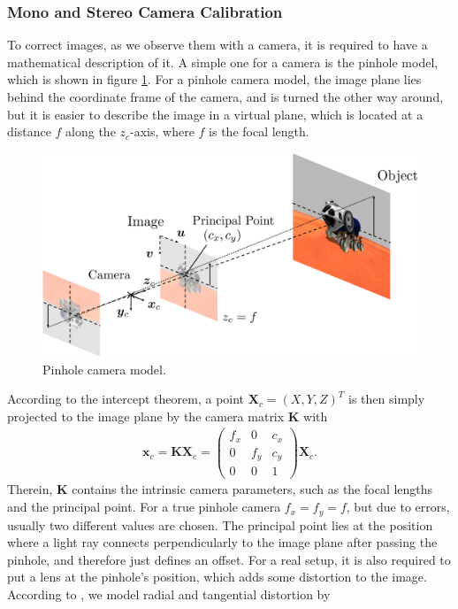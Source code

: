 \subsubsection{Mono and Stereo Camera Calibration}
To correct images, as we observe them with a camera, it is required to have a mathematical description of it. A simple one for a camera is the pinhole model, which is shown in figure \ref{fig::324_pin_hole_camera}. For a pinhole camera model, the image plane lies behind the coordinate frame of the camera, and is turned the other way around, but it is easier to describe the image in a virtual plane, which is located at a distance $f$ along the $z_c$-axis, where $f$ is the focal length.
\begin{figure}[h]
	\centering
	\includegraphics[scale=.28]{chapters/03_background/img/pin_hole_camera.png}
	\caption{Pinhole camera model.}
	\label{fig::324_pin_hole_camera}
\end{figure}
According to the intercept theorem, a point $\bm{X}_c = (X,Y,Z)^T$ is then simply projected to the image plane by the camera matrix $\bm{K}$ with
\begin{align}
	\bm{x}_c = \bm{K}\bm{X}_c = \begin{pmatrix}
	f_x & 0   & c_x \\
	0   & f_y & c_y \\
	0   & 0   & 1
	\end{pmatrix}\bm{X}_c.
\end{align}
Therein, $\bm{K}$ contains the intrinsic camera parameters, such as the focal lengths and the principal point. For a true pinhole camera $f_x = f_y =f$, but due to errors, usually two different values are chosen. The principal point lies at the position where a light ray connects perpendicularly to the image plane after passing the pinhole, and therefore just defines an offset. For a real setup, it is also required to put a lens at the pinhole's position, which adds some distortion to the image. According to \cite{duane1971close}, we model radial and tangential distortion by
